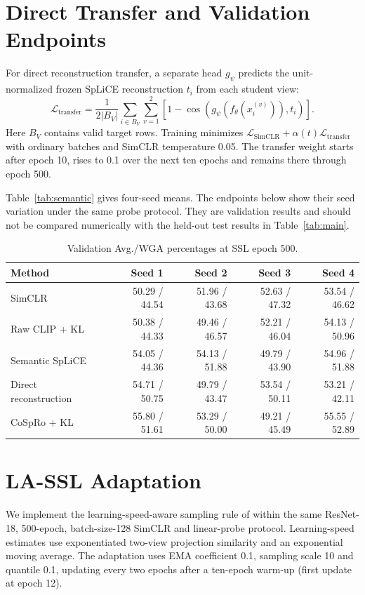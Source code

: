 \documentclass{article}
\begin{document}
\section{Direct Transfer and Validation Endpoints}
\label{app:direct}
\label{app:validation}

For direct reconstruction transfer, a separate head $g_\psi$ predicts the
unit-normalized frozen SpLiCE reconstruction $t_i$ from each student view:
\begin{equation}
 \mathcal{L}_{\mathrm{transfer}}=
 \frac{1}{2|B_V|}\sum_{i\in B_V}\sum_{v=1}^{2}
 \left[1-\cos\!\left(g_\psi(f_\theta(x_i^{(v)})),t_i\right)\right].
\end{equation}
Here $B_V$ contains valid target rows. Training minimizes
$\mathcal{L}_{\mathrm{SimCLR}}+\alpha(t)\mathcal{L}_{\mathrm{transfer}}$
with ordinary batches and SimCLR temperature 0.05. The transfer weight starts
after epoch 10, rises to 0.1 over the next ten epochs and remains there
through epoch 500.

Table~\ref{tab:semantic} gives four-seed means. The endpoints below show
their seed variation under the same probe protocol. They are validation
results and should not be compared numerically with the held-out test
results in Table~\ref{tab:main}.

\begin{table}[htbp]
\centering\small
\caption{Validation Avg./WGA percentages at SSL epoch 500.}
\begin{tabular}{lrrrr}
\toprule
Method & Seed 1 & Seed 2 & Seed 3 & Seed 4 \\
\midrule
SimCLR & 50.29 / 44.54 & 51.96 / 43.68 & 52.63 / 47.32 & 53.54 / 46.62 \\
Raw CLIP + KL & 50.38 / 44.33 & 49.46 / 46.57 & 52.21 / 46.04 & 54.13 / 50.96 \\
Semantic SpLiCE & 54.05 / 44.36 & 54.13 / 51.88 & 49.79 / 43.90 & 54.96 / 51.88 \\
Direct reconstruction & 54.71 / 50.75 & 49.79 / 43.47 & 53.54 / 50.11 & 53.21 / 42.11 \\
CoSpRo + KL & 55.80 / 51.61 & 53.29 / 50.00 & 49.21 / 45.49 & 55.55 / 52.89 \\
\bottomrule
\end{tabular}
\end{table}

\section{LA-SSL Adaptation}\label{app:lassl}
We implement the learning-speed-aware sampling rule of \citet{zhu2023lassl} within the same ResNet-18, 500-epoch, batch-size-128 SimCLR and linear-probe protocol. Learning-speed estimates use exponentiated two-view projection similarity and an exponential moving average. The adaptation uses EMA coefficient 0.1, sampling scale 10 and quantile 0.1, updating every two epochs after a ten-epoch warm-up (first update at epoch 12).
\end{document}
